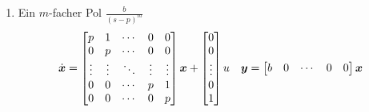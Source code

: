 \begin{enumerate}
    \item Ein $m$-facher Pol $\frac{b}{(s-p)^m}$
    \begin{align*}
        \dot{\boldsymbol{x}} = \begin{bmatrix}
            p&1&\cdots&0&0\\
            0&p&\cdots&0&0\\
            \vdots&\vdots&\ddots&\vdots&\vdots\\
            0&0&\cdots&p&1\\
            0&0&\cdots&0&p
        \end{bmatrix}\boldsymbol{x} + \begin{bmatrix}
        0\\0\\\vdots\\0\\1
        \end{bmatrix} u &&\boldsymbol{y} = \begin{bmatrix}
        b&0&\cdots&0&0
        \end{bmatrix}\boldsymbol{x}
    \end{align*}
    
\end{enumerate}
